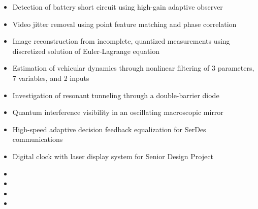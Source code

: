 \documentclass[9pt]{extarticle}
\begin{document}
\begin{itemize}[itemsep=-3pt]
\item Detection of battery short circuit using high-gain adaptive observer
\item Video jitter removal using point feature matching and phase correlation
\item Image reconstruction from incomplete, quantized measurements using discretized solution of Euler-Lagrange equation
\item Estimation of vehicular dynamics through nonlinear filtering of 3 parameters, 7 variables, and 2 inputs
\item Investigation of resonant tunneling through a double-barrier diode
\item Quantum interference visibility in an oscillating macroscopic mirror
\item High-speed adaptive decision feedback equalization for SerDes communications
\item Digital clock with laser display system for Senior Design Project
\end{itemize}
\vspace{-3pt}

\begin{itemize}[itemsep=-3pt]
\item[] 
\item[] 
\item[] 
\item[] 
\end{itemize}
\vspace{-3pt}

\end{document}
